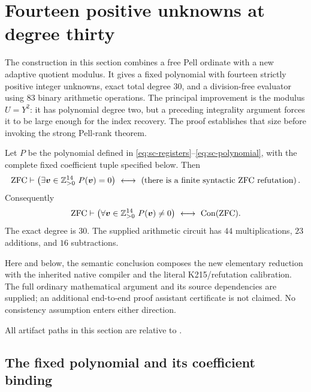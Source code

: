 \section{Fourteen positive unknowns at degree thirty}
\label{sec:sc-fourteen}

The construction in this section combines a free Pell ordinate with a new
adaptive quotient modulus.  It gives a fixed polynomial with fourteen
strictly positive integer unknowns, exact total degree $30$, and a
division-free evaluator using $83$ binary arithmetic operations.  The
principal improvement is the modulus $U=Y^2$: it has polynomial degree two,
but a preceding integrality argument forces it to be large enough for the
index recovery.  The proof establishes that size before invoking the
strong Pell-rank theorem.

\begin{theorem}\label{thm:sc-main}
Let $P$ be the polynomial defined in
\eqref{eq:sc-registers}--\eqref{eq:sc-polynomial}, with the complete fixed
coefficient tuple specified below.  Then
\[
 \mathrm{ZFC}\vdash
 \left(\exists\boldsymbol v\in\mathbb Z_{>0}^{14}\ P(\boldsymbol v)=0\right)
 \ \longleftrightarrow\
 \left(\text{there is a finite syntactic ZFC refutation}\right).
\]
Consequently
\[
 \mathrm{ZFC}\vdash
 \left(\forall\boldsymbol v\in\mathbb Z_{>0}^{14}\ P(\boldsymbol v)\ne0\right)
 \ \longleftrightarrow\ \operatorname{Con}(\mathrm{ZFC}).
\]
The exact degree is $30$.  The supplied arithmetic circuit has $44$
multiplications, $23$ additions, and $16$ subtractions.
\end{theorem}

Here and below, the semantic conclusion composes the new elementary
reduction with the inherited native compiler and the literal
K215/refutation calibration.  The full ordinary mathematical argument and
its source dependencies are supplied; an additional end-to-end proof
assistant certificate is not claimed.  No consistency assumption enters
either direction.

All artifact paths in this section are relative to .

\subsection{The fixed polynomial and its coefficient binding}

